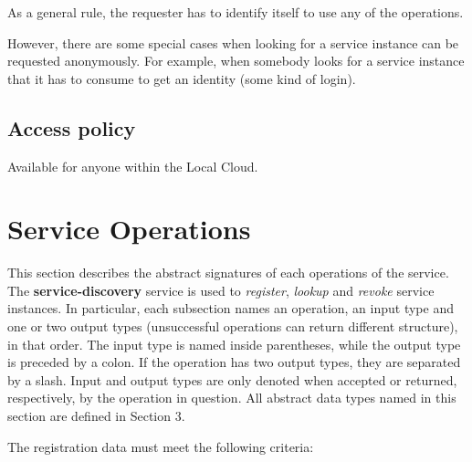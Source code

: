 \documentclass[a4paper]{arrowhead}
\begin{document}
As a general rule, the requester has to identify itself to use any of the operations.

However, there are some special cases when looking for a service instance can be requested anonymously. For example, when somebody looks for a service instance that it has to consume to get an identity (some kind of login).

\subsection{Access policy}
\label{sec:accesspolicy}

Available for anyone within the Local Cloud.

\newpage

\section{Service Operations}
\label{sec:functions}

This section describes the abstract signatures of each operations of the service. The \textbf{service-discovery} service is used to \textit{register}, \textit{lookup} and \textit{revoke} service instances.
In particular, each subsection names an operation, an input type and one or two output types (unsuccessful operations can return different structure), in that order.
The input type is named inside parentheses, while the output type is preceded by a colon. If the operation has two output types, they are separated by a slash.
Input and output types are only denoted when accepted or returned, respectively, by the operation in question. All abstract data types named in this section are defined in Section 3.

{}

The registration data must meet the following criteria:
\end{document}
